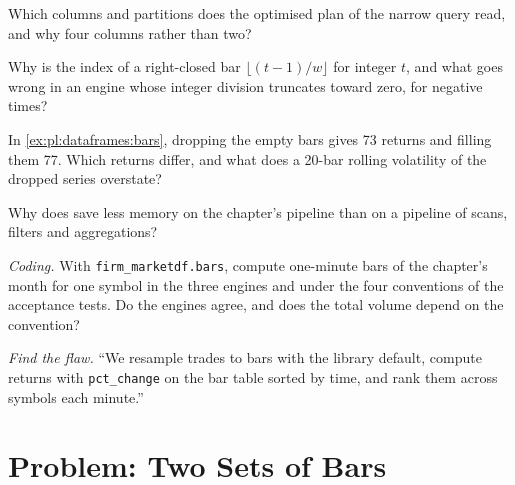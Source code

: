 \begin{exercise}[$\star$]\label{exo:pl:dataframes:3}
Which columns and partitions does the optimised plan of the narrow query read, and why four columns rather than two?
\end{exercise}

\begin{exercise}[$\star\star$]\label{exo:pl:dataframes:4}
Why is the index of a right-closed bar $\lfloor (t-1)/w \rfloor$ for integer $t$, and what goes wrong in an engine whose integer division
truncates toward zero, for negative times?
\end{exercise}

\begin{exercise}[$\star\star$]\label{exo:pl:dataframes:5}
In \cref{ex:pl:dataframes:bars}, dropping the empty bars gives 73 returns and filling them 77. Which returns differ, and what does a
20-bar rolling volatility of the dropped series overstate?
\end{exercise}

\begin{exercise}[$\star\star$]\label{exo:pl:dataframes:6}
Why does  save less memory on the chapter's pipeline than on a pipeline of scans, filters and aggregations?
\end{exercise}

\begin{exercise}[$\star\star\star$]\label{exo:pl:dataframes:7}
\emph{Coding.} With \texttt{firm\_marketdf.bars}, compute one-minute bars of the chapter's month for one symbol in the three engines and
under the four conventions of the acceptance tests. Do the engines agree, and does the total volume depend on the convention?
\end{exercise}

\begin{exercise}[$\star\star\star$]\label{exo:pl:dataframes:8}
\emph{Find the flaw.} ``We resample trades to bars with the library default, compute returns with \texttt{pct\_change} on the bar table
sorted by time, and rank them across symbols each minute.''
\end{exercise}

\section{Problem: Two Sets of Bars}


